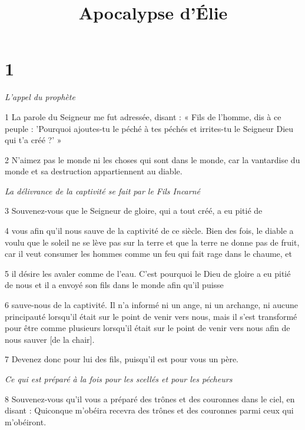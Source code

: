 

\title{Apocalypse d'Élie}

\chapter{1}

\par \textit{L'appel du prophète}

\par 1 La parole du Seigneur me fut adressée, disant : « Fils de l'homme, dis à ce peuple : 'Pourquoi ajoutes-tu le péché à tes péchés et irrites-tu le Seigneur Dieu qui t'a créé ?' »

\par 2 N'aimez pas le monde ni les choses qui sont dans le monde, car la vantardise du monde et sa destruction appartiennent au diable.

\par \textit{La délivrance de la captivité se fait par le Fils Incarné}

\par 3 Souvenez-vous que le Seigneur de gloire, qui a tout créé, a eu pitié de

\par 4 vous afin qu'il nous sauve de la captivité de ce siècle. Bien des fois, le diable a voulu que le soleil ne se lève pas sur la terre et que la terre ne donne pas de fruit, car il veut consumer les hommes comme un feu qui fait rage dans le chaume, et

\par 5 il désire les avaler comme de l'eau. C'est pourquoi le Dieu de gloire a eu pitié de nous et il a envoyé son fils dans le monde afin qu'il puisse

\par 6 sauve-nous de la captivité. Il n'a informé ni un ange, ni un archange, ni aucune principauté lorsqu'il était sur le point de venir vers nous, mais il s'est transformé pour être comme plusieurs lorsqu'il était sur le point de venir vers nous afin de nous sauver [de la chair].

\par 7 Devenez donc pour lui des fils, puisqu'il est pour vous un père.

\par \textit{Ce qui est préparé à la fois pour les scellés et pour les pécheurs}

\par 8 Souvenez-vous qu'il vous a préparé des trônes et des couronnes dans le ciel, en disant : Quiconque m'obéira recevra des trônes et des couronnes parmi ceux qui m'obéiront.


